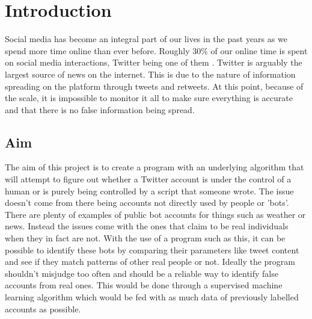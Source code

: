 
\chapter{Introduction} %

\label{Chapter1} %

Social media has become an integral part of our lives in the past years as we spend more time online than ever before. Roughly 30\% of our online time is spent on social media interactions, Twitter being one of them \cite{globalwebindex}.
Twitter is arguably the largest source of news on the internet. This is due to the nature of information spreading on the platform through tweets and retweets. At this point, because of the scale, it is impossible to monitor it all to make sure everything is accurate and that there is no false information being spread. 

\section{Aim}
The aim of this project is to create a program with an underlying algorithm that will attempt to figure out whether a Twitter account is under the control of a human or is purely being controlled by a script that someone wrote. The issue doesn't come from there being accounts not directly used by people or 'bots'. There are plenty of examples of public bot accounts for things such as weather or news. Instead the issues come with the ones that claim to be real individuals when they in fact are not. With the use of a program such as this, it can be possible to identify these bots by comparing their parameters like tweet content and see if they match patterns of other real people or not.
\newline
Ideally the program shouldn't misjudge too often and should be a reliable way to identify false accounts from real ones. This would be done through a supervised machine learning algorithm which would be fed with as much data of previously labelled accounts as possible.

